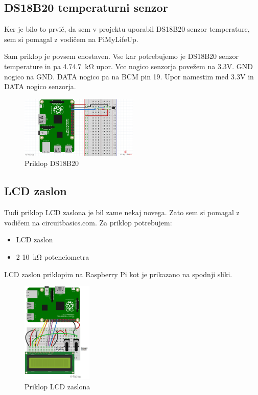 \documentclass[11pt]{article}
\begin{document}
\subsection{DS18B20 temperaturni senzor}
Ker je bilo to prvič, da sem v projektu uporabil DS18B20 senzor temperature, sem si pomagal z vodičem na PiMyLifeUp\cite{PiMyLifeUp_DS18B20}.

Sam priklop je povsem enostaven. Vse kar potrebujemo je DS18B20 senzor temperature in pa 4.7\SI{4.7}{\kohm} upor. Vcc nogico senzorja povežem na 3.3V. GND nogico na GND. DATA nogico pa na BCM pin 19. Upor namestim med 3.3V in DATA nogico senzorja.
\begin{figure}[h]
\centering
\includegraphics[width=0.5\textwidth]{images/DS18B20_diagram.png}
\caption{Priklop DS18B20}
\end{figure}

\subsection{LCD zaslon}
Tudi priklop LCD zaslona je bil zame nekaj novega. Zato sem si pomagal z vodičem na circuitbasics.com\cite{CB_LCD}.
Za priklop potrebujem:
\begin{itemize}
    \item LCD zaslon
    \item 2 \SI{10}{\kohm} potenciometra
\end{itemize}
LCD zaslon priklopim na Raspberry Pi kot je prikazano na spodnji sliki.
\begin{figure}[h]
\centering
\includegraphics[width=0.3\textwidth]{images/LCD_4bit.png}
\caption{Priklop LCD zaslona}
\end{figure}
\newpage
\end{document}

